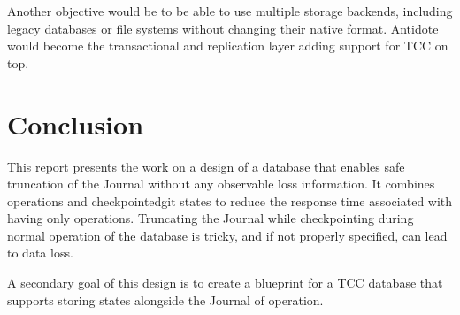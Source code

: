 \documentclass[twoside]{article}
\begin{document}
Another objective would be to be able to use multiple storage backends,
including legacy databases or file systems without changing their
native format. 
Antidote would become the transactional and replication layer adding support
for TCC on top.




\section{Conclusion}
\label{sec:conclusion}

This report presents the work on a design of a database that enables safe 
truncation of the Journal without any observable loss information. 
It combines operations and checkpointedgit states to reduce the response time
associated with having only operations.
Truncating the Journal while checkpointing during normal operation of the
database is tricky, and if not properly specified, can lead to data loss.

A secondary goal of this design is to create a blueprint for a TCC database that
supports storing states alongside the Journal of operation.




\tableofcontents
\end{document}
